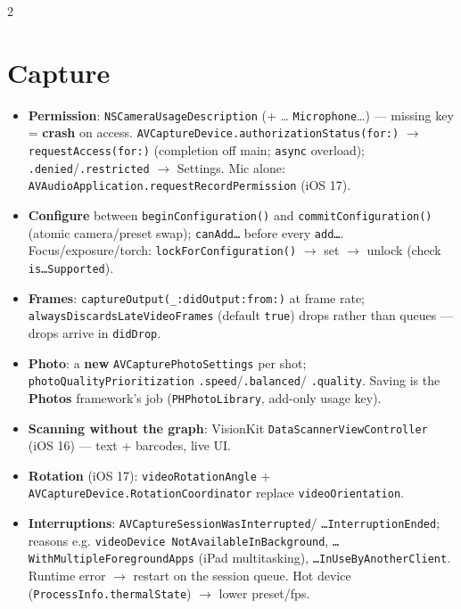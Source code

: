 \documentclass[8pt]{extarticle}
\begin{document}
\begin{multicols}{2}
\raggedright

\section{Capture}
\begin{itemize}
  \item \textbf{Permission}: \texttt{NSCameraUsageDescription} (+ \dots
        \texttt{Microphone}\dots) — missing key = \textbf{crash} on access.
        \texttt{AVCaptureDevice.\allowbreak authorizationStatus(for:)} $\to$
        \texttt{requestAccess(for:)} (completion off main; \texttt{async} overload);
        \texttt{.denied}/\texttt{.restricted} $\to$ Settings. Mic alone:
        \texttt{AVAudioApplication.\allowbreak requestRecordPermission} (iOS 17).
  \item \textbf{Configure} between \texttt{beginConfiguration()} and
        \texttt{commitConfiguration()} (atomic camera/preset swap);
        \texttt{canAdd\dots} before every \texttt{add\dots}. Focus/exposure/torch:
        \texttt{lockForConfiguration()} $\to$ set $\to$ unlock (check
        \texttt{is\dots Supported}).
  \item \textbf{Frames}: \texttt{captureOutput(\_:didOutput:from:)} at frame rate;
        \texttt{alwaysDiscardsLateVideoFrames} (default \texttt{true}) drops rather
        than queues — drops arrive in \texttt{didDrop}.
  \item \textbf{Photo}: a \textbf{new} \texttt{AVCapturePhotoSettings} per shot;
        \texttt{photoQualityPrioritization} \texttt{.speed}/\texttt{.balanced}/\allowbreak
        \texttt{.quality}. Saving is the \textbf{Photos} framework's job
        (\texttt{PHPhotoLibrary}, add-only usage key).
  \item \textbf{Scanning without the graph}: VisionKit
        \texttt{DataScannerViewController} (iOS 16) — text + barcodes, live UI.
  \item \textbf{Rotation} (iOS 17): \texttt{videoRotationAngle} +
        \texttt{AVCaptureDevice.\allowbreak RotationCoordinator} replace
        \texttt{videoOrientation}.
  \item \textbf{Interruptions}: \texttt{AVCaptureSessionWasInterrupted}/\allowbreak
        \texttt{\dots InterruptionEnded}; reasons e.g. \texttt{videoDevice\allowbreak
        NotAvailableInBackground}, \texttt{\dots WithMultipleForegroundApps} (iPad
        multitasking), \texttt{\dots InUseByAnotherClient}. Runtime error $\to$
        restart on the session queue. Hot device
        (\texttt{ProcessInfo.thermalState}) $\to$ lower preset/fps.
\end{itemize}


\end{multicols}
\end{document}

